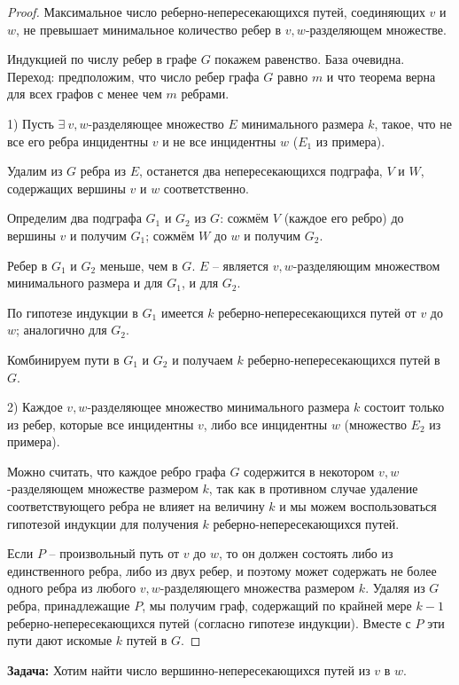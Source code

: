 	\begin{proof}
		Максимальное число реберно-непересекающихся путей, соединяющих $v$ и $w$, не превышает минимальное количество ребер в $v, w$-разделяющем множестве.
		
		Индукцией по числу ребер в графе $G$ покажем равенство. База очевидна. Переход: предположим, что число ребер графа $G$ равно $m$ и что теорема верна для всех графов с менее чем $m$ ребрами.

		1) Пусть $\exists \ v, w$-разделяющее множество $E$ минимального размера $k$, такое, что не все его ребра инцидентны $v$ и не все инцидентны $w$ ($E_1$ из примера).

		Удалим из $G$ ребра из $E$, останется два непересекающихся подграфа, $V$ и $W$, содержащих вершины $v$ и $w$ соответственно.

		Определим два подграфа $G_1$ и $G_2$ из $G$: сожмём $V$ (каждое его ребро) до вершины $v$ и получим $G_1$; сожмём $W$ до $w$ и получим $G_2$.

		Ребер в $G_1$ и $G_2$ меньше, чем в $G$. $E$ -- является $v, w$-разделяющим множеством минимального размера и для $G_1$, и для $G_2$.

		По гипотезе индукции в $G_1$ имеется $k$ реберно-непересекающихся путей от $v$ до $w$; аналогично для $G_2$.

		Комбинируем пути в $G_1$ и $G_2$ и получаем $k$ реберно-непересекающихся путей в $G$.

		2) Каждое $v,w$-разделяющее множество минимального размера $k$ состоит только из ребер, которые все инцидентны $v$, либо все инцидентны $w$ (множество $E_2$ из примера).

		Можно считать, что каждое ребро графа $G$ содержится в некотором $v,w$-разделяющем множестве размером $k$, так как в противном случае удаление соответствующего ребра не влияет на величину $k$
		и мы можем воспользоваться гипотезой индукции для получения $k$ реберно-непересекающихся путей.

		Если $P$ -- произвольный путь от $v$ до $w$, то он должен состоять либо из единственного ребра, либо из двух ребер, и поэтому может содержать не более одного ребра из любого $v,w$-разделяющего множества размером $k$.
		Удаляя из $G$ ребра, принадлежащие $P$, мы получим граф, содержащий по крайней мере $k-1$ реберно-непересекающихся путей (согласно гипотезе индукции). Вместе с $P$ эти пути дают искомые $k$ путей в $G$.
	\end{proof}

	\textbf{Задача:} Хотим найти число вершинно-непересекающихся путей из $v$ в $w$.
	
